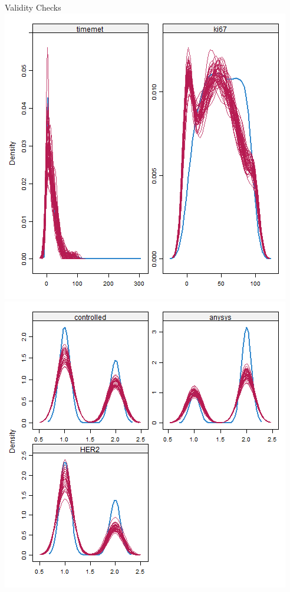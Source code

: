 \begin{frame}{Validity Checks}
\includegraphics[width=.5\textwidth]{cont_densplot}%
\includegraphics[width=.5\textwidth]{discrete_densplot} 
\end{frame}

